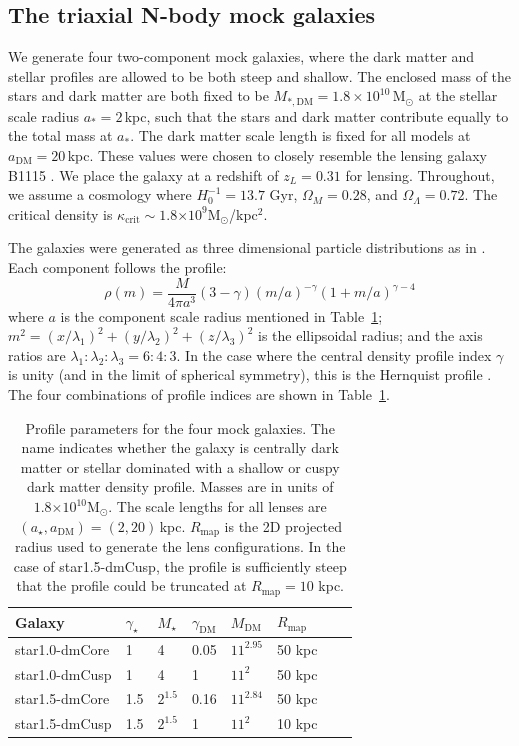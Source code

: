 \documentclass[galley,usenatbib]{mn2e}
\newcommand{\Rmap}{\ensuremath{R_\mathrm{map}}}
\newcommand{\Msun}{\ensuremath{\mathrm{M}_\odot}}
\newcommand{\tabref}[1] {Table~\ref{#1}}
\newcommand{\e}[1]{\ensuremath{\times 10^{#1}}}
\newcommand{\mockAA}{{\sc star1.0-dmCore}}
\newcommand{\mockAC}{{\sc star1.0-dmCusp}}
\newcommand{\mockBB}{{\sc star1.5-dmCore}}
\newcommand{\mockBC}{{\sc star1.5-dmCusp}}
\begin{document}
\subsection{The triaxial N-body mock galaxies}

We generate four two-component mock galaxies, where the dark matter and stellar
profiles are allowed to be both steep and shallow.  
The enclosed mass of the stars and dark matter are both fixed to be 
$M_{*,\mathrm{DM}} = 1.8 \times 10^{10}$\,M$_\odot$ at the stellar scale radius 
$a_* = 2$\,kpc, such that the stars and dark matter contribute equally to the total
mass at $a_*$. The dark matter scale length is fixed for all models at $a_\mathrm{DM}
= 20$\,kpc.
These
values were chosen to closely resemble the lensing galaxy B1115 \citep{1980Natur.285..641W}. We place the galaxy at
a redshift of $z_L = 0.31$ for lensing.  Throughout, we assume a cosmology
where $H_0^{-1}=13.7$ Gyr, $\Omega_M=0.28$, and $\Omega_\Lambda=0.72$. The
critical density is $\kappa_\mathrm{crit}\sim 1.8\e{9}$\Msun/kpc$^2$.


The galaxies were generated as three dimensional particle distributions as in
\citet{2009MNRAS.395.1079D}. Each component follows the profile:
%
\begin{equation} 
  \rho(m) = \frac{M}{4\pi a^3}(3-\gamma){(m/a)^{-\gamma}(1 + m/a)^{\gamma-4}} 
  \label{Dehnen profile} 
\end{equation} 
%
where $a$ is the component scale radius mentioned in \tabref{mock galaxy params};
$m^2 = (x/\lambda_1)^2 + (y/\lambda_2)^2 + (z/\lambda_3)^2$ is the ellipsoidal radius; and the axis
ratios are $\lambda_1:\lambda_2:\lambda_3 = 6:4:3$.
In the case where the central density profile index
$\gamma$ is unity (and in the limit of spherical symmetry), this is the Hernquist
profile \citep{1990ApJ...356..359H}.  The four combinations of profile indices
are shown in \tabref{mock galaxy params}.

\begin{table}
\begin{tabular}{llllllll}
Galaxy & $\gamma_\star$ & $M_\star$ & $\gamma_\mathrm{DM}$ & $M_\mathrm{DM}$ & $\Rmap$ \\
\hline
\mockAA & 1 & 4 & 0.05 & $11^{2.95}$ & 50 kpc\\ %
\mockAC & 1 & 4 & 1 & $11^2$ & 50 kpc \\ %
\mockBB & 1.5 & $2^{1.5}$ & 0.16 & $11^{2.84}$ & 50 kpc \\ %
\mockBC & 1.5 & $2^{1.5}$ & 1 & $11^2$ & 10 kpc %
\end{tabular}
\caption{Profile parameters for the four mock galaxies. The name indicates whether 
  the galaxy is centrally dark matter or stellar dominated with a shallow or cuspy 
  dark matter density profile.  Masses are in units of
  $1.8\e{10}\Msun$. The scale lengths for all lenses are
  $(a_\star,a_\mathrm{DM})=(2,20)$\,kpc. $\Rmap$ is the 2D projected radius
used to generate the lens configurations. In the case of \mockBC, the profile is 
sufficiently steep that the profile could be truncated at $\Rmap = 10$ kpc.}
\label{mock galaxy params}
\end{table}
\end{document}
